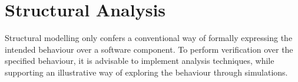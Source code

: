 


\section{Structural Analysis}

Structural modelling only confers a conventional way of formally expressing the intended behaviour over a software component. To perform verification over the specified behaviour, it is advisable to implement analysis techniques, while supporting an illustrative way of exploring the behaviour through simulations. 

